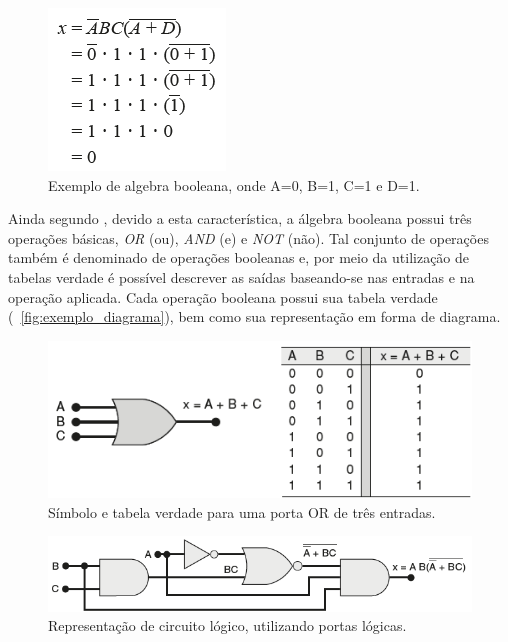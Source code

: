 \begin{figure}[!htbp]
	\begin{center}
    \caption{\label{fig:algebra_booleana}Exemplo de algebra booleana, onde A=0, B=1, C=1 e D=1.}
	\includegraphics[scale=0.70]{Figuras/algebra_booleana.png}
	\end{center}
\end{figure}

\par
Ainda segundo \citeauthor{tocci2003sistemas}, devido a esta característica, a álgebra booleana possui três operações básicas, \textit{OR} (ou), \textit{AND} (e) e \textit{NOT} (não). Tal conjunto de operações também é denominado de operações booleanas e, por meio da utilização de tabelas verdade é possível descrever as saídas baseando-se nas entradas e na operação aplicada. Cada operação booleana possui sua tabela verdade (~\autoref{fig:exemplo_diagrama}), bem como sua representação em forma de diagrama.

\begin{figure}[H]
	\begin{center}
    \caption{\label{fig:exemplo_diagrama}Símbolo e tabela verdade para uma porta OR de três entradas.}
	\includegraphics[scale=0.60]{Figuras/exemplo_diagrama.png}
	\end{center}
\end{figure}

\begin{figure}[H]
	\begin{center}
    \caption{\label{fig:exemplo_circuito} Representação de circuito lógico, utilizando portas lógicas.}
	\includegraphics[scale=0.60]{Figuras/exemplo_circuito.png}
	\end{center}
\end{figure}

